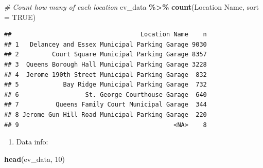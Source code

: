 \documentclass[
  12pt,
]{article}
\newenvironment{Shaded}{\begin{snugshade}}{\end{snugshade}}
\newcommand{\AttributeTok}[1]{\textcolor[rgb]{0.13,0.29,0.53}{#1}}
\newcommand{\CommentTok}[1]{\textcolor[rgb]{0.56,0.35,0.01}{\textit{#1}}}
\newcommand{\ConstantTok}[1]{\textcolor[rgb]{0.56,0.35,0.01}{#1}}
\newcommand{\DecValTok}[1]{\textcolor[rgb]{0.00,0.00,0.81}{#1}}
\newcommand{\FunctionTok}[1]{\textcolor[rgb]{0.13,0.29,0.53}{\textbf{#1}}}
\newcommand{\NormalTok}[1]{#1}
\newcommand{\SpecialCharTok}[1]{\textcolor[rgb]{0.81,0.36,0.00}{\textbf{#1}}}
\newcommand{\StringTok}[1]{\textcolor[rgb]{0.31,0.60,0.02}{#1}}
\providecommand{\tightlist}{%
  \setlength{\itemsep}{0pt}\setlength{\parskip}{0pt}}
\begin{document}
\begin{Shaded}
\begin{Highlighting}[]
\CommentTok{\# Count how many of each location}
\NormalTok{ev\_data }\SpecialCharTok{\%\textgreater{}\%} \FunctionTok{count}\NormalTok{(}\StringTok{\textasciigrave{}}\AttributeTok{Location Name}\StringTok{\textasciigrave{}}\NormalTok{, }\AttributeTok{sort =} \ConstantTok{TRUE}\NormalTok{)}
\end{Highlighting}
\end{Shaded}

\begin{verbatim}
##                                   Location Name    n
## 1   Delancey and Essex Municipal Parking Garage 9030
## 2         Court Square Municipal Parking Garage 8357
## 3  Queens Borough Hall Municipal Parking Garage 3228
## 4  Jerome 190th Street Municipal Parking Garage  832
## 5            Bay Ridge Municipal Parking Garage  732
## 6                  St. George Courthouse Garage  640
## 7          Queens Family Court Municipal Garage  344
## 8 Jerome Gun Hill Road Municipal Parking Garage  220
## 9                                          <NA>    8
\end{verbatim}

\begin{enumerate}
\def\labelenumi{\arabic{enumi}.}
\setcounter{enumi}{6}
\tightlist
\item
  Data info:
\end{enumerate}

\begin{Shaded}
\begin{Highlighting}[]
\FunctionTok{head}\NormalTok{(ev\_data, }\DecValTok{10}\NormalTok{)}
\end{Highlighting}
\end{Shaded}
\end{document}
